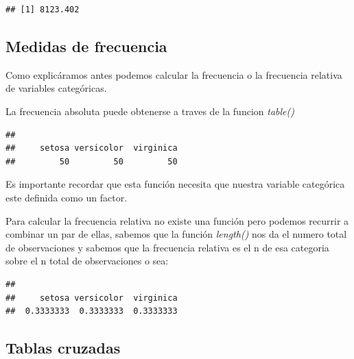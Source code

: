 \documentclass[
]{book}
\newenvironment{Shaded}{\begin{snugshade}}{\end{snugshade}}
\newcommand{\FunctionTok}[1]{\textcolor[rgb]{0.00,0.00,0.00}{#1}}
\newcommand{\NormalTok}[1]{#1}
\newcommand{\SpecialCharTok}[1]{\textcolor[rgb]{0.00,0.00,0.00}{#1}}
\begin{document}
\begin{verbatim}
## [1] 8123.402
\end{verbatim}

\hypertarget{medidas-de-frecuencia}{%
\subsection{Medidas de frecuencia}\label{medidas-de-frecuencia}}

Como explicáramos antes podemos calcular la frecuencia o la frecuencia relativa de variables categóricas.

La frecuencia absoluta puede obtenerse a traves de la funcion \emph{table()}

\begin{Shaded}
\end{Shaded}

\begin{verbatim}
## 
##     setosa versicolor  virginica 
##         50         50         50
\end{verbatim}

Es importante recordar que esta función necesita que nuestra variable categórica este definida como un factor.

Para calcular la frecuencia relativa no existe una función pero podemos recurrir a combinar un par de ellas, sabemos que la función \emph{length()} nos da el numero total de observaciones y sabemos que la frecuencia relativa es el n de esa categoria sobre el n total de observaciones o sea:

\begin{Shaded}
\end{Shaded}

\begin{verbatim}
## 
##     setosa versicolor  virginica 
##  0.3333333  0.3333333  0.3333333
\end{verbatim}

\hypertarget{tablas-cruzadas}{%
\subsection{Tablas cruzadas}\label{tablas-cruzadas}}
\end{document}
